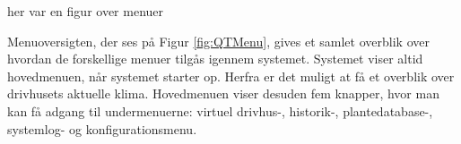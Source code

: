 \clearpage

her var en figur over menuer 

Menuoversigten, der ses på Figur \ref{fig:QTMenu}, gives et samlet overblik over hvordan de forskellige menuer tilgås igennem systemet. Systemet viser altid hovedmenuen, når systemet starter op. Herfra er det muligt at få et overblik over drivhusets aktuelle klima. Hovedmenuen viser desuden fem knapper, hvor man kan få adgang til undermenuerne: virtuel drivhus-, historik-, plantedatabase-, systemlog- og konfigurationsmenu.

\clearpage
